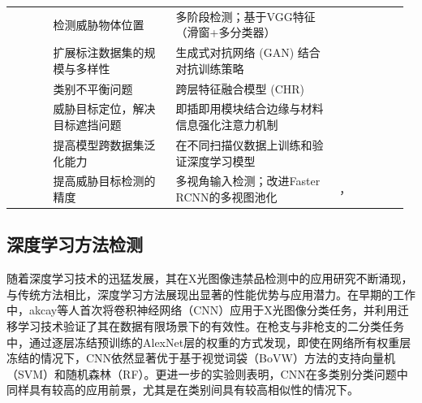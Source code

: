 \documentclass[11pt,twocolumn]{ctexart}
\begin{document}
\begin{table}
\begin{tabular*}{\linewidth}{>{\centering\arraybackslash}p{0.1 \linewidth}|%
>{\centering\arraybackslash}p{0.3\linewidth}|%
>{\centering\arraybackslash}p{0.4\linewidth}|%
>{\centering\arraybackslash}p{0.17\linewidth}}
                          & 检测威胁物体位置              & 多阶段检测；基于VGG特征（滑窗+多分类器）                 & \cite{jaccard2017detection, griffin2009basic, bosch2007representing}                                       \\
                          & 扩展标注数据集的规模与多样性        & 生成式对抗网络 (GAN) 结合对抗训练策略                 & \cite{zhao2018gan, yang2019data}                                                                           \\
                          & 类别不平衡问题  & 跨层特征融合模型 (CHR)                         & \cite{miao2019sixray}                                                                                      \\
                          & 威胁目标定位，解决目标遮挡问题       & 即插即用模块结合边缘与材料信息强化注意力机制                 & \cite{wei2020occluded}                                                                                     \\
                          & 提高模型跨数据集泛化能力          & 在不同扫描仪数据上训练和验证深度学习模型                   & \cite{caldwell2017transferring, gaus2019evaluating}                                                        \\
                          & 提高威胁目标检测的精度           & 多视角输入检测；改进Faster RCNN的多视图池化            & \cite{liang2018automatic}，\cite{steitz2018multi}                                                           \\
\hline\hline %
\end{tabular*}
\vspace{1cm} %
\label{X光图像违禁品检测技术概述}
\end{table}

\subsection{深度学习方法检测}
随着深度学习技术的迅猛发展，其在X光图像违禁品检测中的应用研究不断涌现，与传统方法相比，深度学习方法展现出显著的性能优势与应用潜力。在早期的工作中，akcay等人\cite{akccay2016transfer}首次将卷积神经网络（CNN）应用于X光图像分类任务，并利用迁移学习技术验证了其在数据有限场景下的有效性。在枪支与非枪支的二分类任务中，通过逐层冻结预训练的AlexNet层的权重的方式发现，即使在网络所有权重层冻结的情况下，CNN依然显著优于基于视觉词袋（BoVW）方法的支持向量机（SVM）和随机森林（RF）。更进一步的实验则表明，CNN在多类别分类问题中同样具有较高的应用前景，尤其是在类别间具有较高相似性的情况下。
\end{document}
